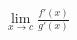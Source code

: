 \documentclass[preview]{standalone}
\begin{document}
\begin{align*}
\lim_{x \to c} \frac{f'(x)}{g'(x)}
\end{align*}
\end{document}
